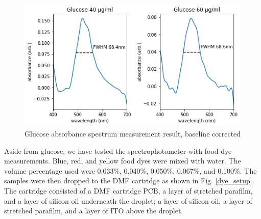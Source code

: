 \documentclass[conference]{IEEEtran}
\begin{document}
    \begin{figure}[htbp]
    \centerline{\includegraphics[scale=0.5]{glucose-res.png}}
    \caption{Glucose absorbance spectrum measurement result, baseline corrected}
    \label{glucose_result}
    \end{figure}

Aside from glucose, we have tested the spectrophotometer with food dye measurements.
Blue, red, and yellow food dyes were mixed with water.
The volume percentage used were 0.033\%, 0.040\%, 0.050\%, 0.067\%, and 0.100\%.
The samples were then dropped to the DMF cartridge as shown in Fig. \ref{dye_setup}.
The cartridge consisted of a DMF cartridge PCB, a layer of stretched parafilm, and a layer of silicon oil underneath the droplet;
a layer of silicon oil, a layer of stretched parafilm, and a layer of ITO above the droplet. 
\end{document}
